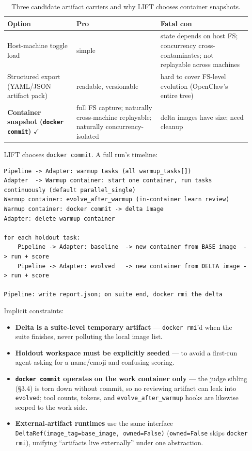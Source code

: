\documentclass{article}
\newcommand{\brk}[1]{\texttt{\seqsplit{#1}}}
\begin{document}
\begin{table}[h]
\centering
\caption{Three candidate artifact carriers and why LIFT chooses container snapshots.}
\label{tab:carrier}
\begin{tabular}{P{0.28\textwidth}P{0.26\textwidth}P{0.4\textwidth}}
\toprule
Option & Pro & Fatal con \\
\midrule
Host-machine toggle load & simple & state depends on host FS; concurrency cross-contaminates; not replayable across machines \\
Structured export (YAML/JSON artifact pack) & readable, versionable & hard to cover FS-level evolution (OpenClaw's entire \brk{\textasciitilde/.openclaw/} tree) \\
\textbf{Container snapshot (\texttt{docker commit})} $\checkmark$ & full FS capture; naturally cross-machine replayable; naturally concurrency-isolated & delta images have size; need cleanup \\
\bottomrule
\end{tabular}
\end{table}

LIFT chooses \texttt{docker commit}. A full run's timeline:

\begin{lstlisting}
Pipeline -> Adapter: warmup tasks (all warmup_tasks[])
Adapter  -> Warmup container: start one container, run tasks continuously (default parallel_single)
Warmup container: evolve_after_warmup (in-container learn review)
Warmup container: docker commit -> delta image
Adapter: delete warmup container

for each holdout task:
    Pipeline -> Adapter: baseline  -> new container from BASE image  -> run + score
    Pipeline -> Adapter: evolved   -> new container from DELTA image -> run + score

Pipeline: write report.json; on suite end, docker rmi the delta
\end{lstlisting}

Implicit constraints:

\begin{itemize}
\item \textbf{Delta is a suite-level temporary artifact} --- \texttt{docker rmi}'d when the suite finishes, never polluting the local image list.
\item \textbf{Holdout workspace must be explicitly seeded} --- to avoid a first-run agent asking for a name/emoji and confusing scoring.
\item \textbf{\texttt{docker commit} operates on the work container only} --- the judge sibling (\S3.4) is torn down without commit, so no reviewing artifact can leak into \texttt{evolved}; tool counts, tokens, and \texttt{evolve\_after\_warmup} hooks are likewise scoped to the work side.
\item \textbf{External-artifact runtimes} use the same interface \texttt{DeltaRef(image\_tag=base\_image, owned=False)} (\texttt{owned=False} skips \texttt{docker rmi}), unifying ``artifacts live externally'' under one abstraction.
\end{itemize}
\end{document}
